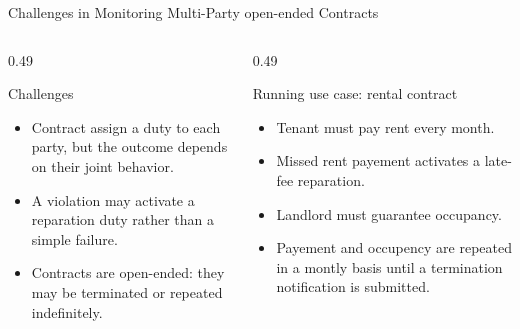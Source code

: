 \documentclass[9pt,aspectratio=169]{beamer}
\begin{document}

\begin{frame}{Challenges in Monitoring Multi-Party open-ended Contracts}
\small
\begin{columns}[T,totalwidth=\textwidth]
  \begin{column}{0.49\textwidth}
    \begin{block}{Challenges}
      \begin{itemize}
        \item Contract assign a duty to each party, but the outcome depends on their joint behavior.
        \item A violation may activate a reparation duty rather than a simple failure.
        \item Contracts are open-ended: they may be terminated or repeated indefinitely.
      \end{itemize}
    \end{block}
  \end{column}
\begin{column}{0.49\textwidth}
  \begin{block}{Running use case: rental contract}
    \begin{itemize}
      \item Tenant must pay rent every month.
      \item Missed rent payement activates a late-fee reparation.
      \item Landlord must guarantee occupancy.
      \item Payement and occupency are repeated in a montly basis until a termination notification is submitted.
    \end{itemize}
  \end{block}
\end{column}

\end{columns}

\vspace{2mm}
\begin{center}
\end{center}
\end{frame}
\end{document}
